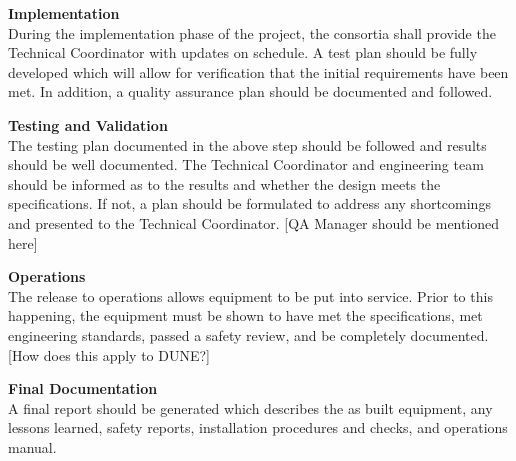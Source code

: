 {\bf Implementation}\\ During the implementation phase of the project,
the consortia shall provide the Technical Coordinator with updates on
schedule.  A test plan should be fully developed which will allow for
verification that the initial requirements have been met. In addition,
a quality assurance plan should be documented and followed.

{\bf Testing and Validation\\}
The testing plan documented in the above step should be followed and
results should be well documented.  The Technical Coordinator and
engineering team should be informed as to the results and whether the
design meets the specifications.  If not, a plan should be formulated
to address any shortcomings and presented to the Technical
Coordinator. [QA Manager should be mentioned here]

{\bf Operations\\}
The release to operations allows equipment to be put into service.
Prior to this happening, the equipment must be shown to have met the
specifications, met engineering standards, passed a safety review, and
be completely documented. [How does this apply to DUNE?]

{\bf Final Documentation\\}
A final report should be generated which describes the as built
equipment, any lessons learned, safety reports, installation procedures
and checks, and operations manual.
